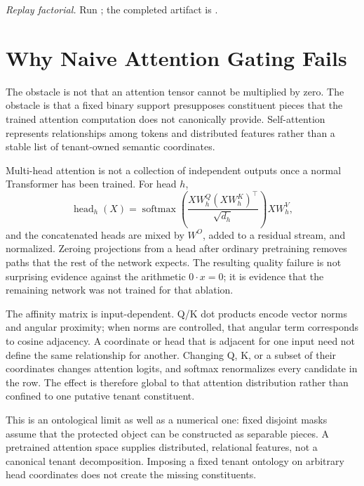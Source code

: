 \documentclass[11pt]{article}
\begin{document}
\begin{sloppypar}
\noindent\textit{Replay factorial.} Run
; the completed
artifact is
.
\end{sloppypar}

\section{Why Naive Attention Gating Fails}

The obstacle is not that an attention tensor cannot be multiplied by zero. The
obstacle is that a fixed binary support presupposes constituent pieces that the
trained attention computation does not canonically provide. Self-attention
represents relationships among tokens and distributed features rather than a
stable list of tenant-owned semantic coordinates.

Multi-head attention is not a collection of independent outputs once a normal
Transformer has been trained. For head $h$,
\begin{equation}
  \operatorname{head}_h(X)=
  \operatorname{softmax}\!\left(
  \frac{XW_h^Q(XW_h^K)^\top}{\sqrt{d_h}}
  \right)XW_h^V,
\end{equation}
and the concatenated heads are mixed by $W^O$, added to a residual stream, and
normalized. Zeroing projections from a head after ordinary pretraining removes
paths that the rest of the network expects. The resulting quality failure is
not surprising evidence against the arithmetic $0\cdot x=0$; it is evidence
that the remaining network was not trained for that ablation.

The affinity matrix is input-dependent. Q/K dot products encode vector norms
and angular proximity; when norms are controlled, that angular term corresponds
to cosine adjacency. A coordinate or head that is adjacent for one input need
not define the same relationship for another. Changing Q, K, or a subset of
their coordinates changes attention logits, and softmax renormalizes every
candidate in the row. The effect is therefore global to that attention
distribution rather than confined to one putative tenant constituent.

This is an ontological limit as well as a numerical one: fixed disjoint masks
assume that the protected object can be constructed as separable pieces. A
pretrained attention space supplies distributed, relational features, not a
canonical tenant decomposition. Imposing a fixed tenant ontology on arbitrary
head coordinates does not create the missing constituents.
\end{document}

